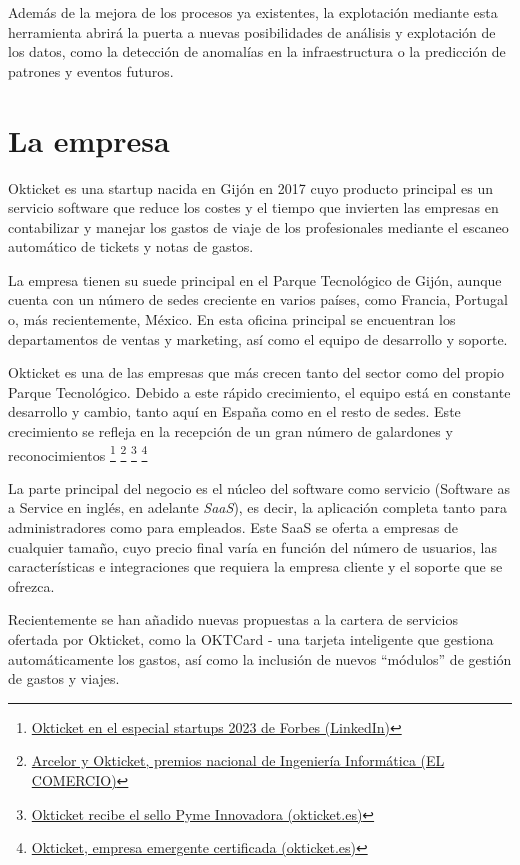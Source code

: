 Además de la mejora de los procesos ya existentes, la explotación mediante esta herramienta
abrirá la puerta a nuevas posibilidades de análisis y explotación de los datos, como la detección
de anomalías en la infraestructura o la predicción de patrones y eventos futuros.

\section{La empresa}\label{sec:empresa}
Okticket es una startup nacida en Gijón en 2017 cuyo producto principal es un servicio software
que reduce los costes y el tiempo que invierten las empresas en contabilizar y manejar los gastos
de viaje de los profesionales mediante el escaneo automático de tickets y notas de gastos.

La empresa tienen su suede principal  en el Parque Tecnológico de Gijón, aunque cuenta con un número
de sedes creciente en varios países, como Francia, Portugal o, más recientemente, México. En esta
oficina principal se encuentran los departamentos de ventas y marketing, así como el equipo de
desarrollo y soporte.

Okticket es una de las empresas que más crecen tanto del sector como del propio Parque
Tecnológico. Debido a este rápido crecimiento, el equipo está en constante desarrollo y
cambio, tanto aquí en España como en el resto de sedes. Este crecimiento se refleja
en la recepción de un gran número de galardones y reconocimientos
\footnote{\href{https://www.linkedin.com/posts/okticket_okticket-en-el-especial-startups-de-forbes-activity-7140622980618903552-UGWK}{Okticket en el especial startups 2023 de Forbes (LinkedIn)}}
\footnote{\href{https://www.elcomercio.es/economia/arcelor-okticket-premios-20230222002438-ntvo.html}{Arcelor y Okticket, premios nacional de Ingeniería Informática (EL COMERCIO)}}
\footnote{\href{https://www.okticket.es/blog/empresa-pyme-innovadora}{Okticket recibe el sello Pyme Innovadora (okticket.es)}}
\footnote{\href{https://www.okticket.es/blog/okticket-empresa-emergente-certificada}{Okticket, empresa emergente certificada (okticket.es)}}

La parte principal del negocio es el núcleo del software como servicio (Software as a
Service en inglés, en adelante \textit{SaaS}), es decir, la aplicación completa tanto
para administradores como para empleados. Este SaaS se oferta a empresas de cualquier
tamaño, cuyo precio final varía en función del número de usuarios, las características
e integraciones que requiera la empresa cliente y el soporte que se ofrezca.

Recientemente se han añadido nuevas propuestas a la cartera de servicios ofertada por
Okticket, como la OKTCard {-} una tarjeta inteligente que gestiona automáticamente los gastos,
así como la inclusión de nuevos ``módulos'' de gestión de gastos y viajes.
